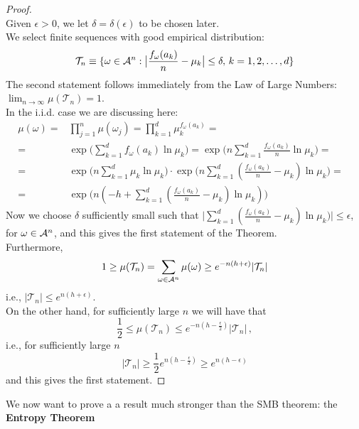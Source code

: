 \begin{proof}
    \hfill \\ 
    Given $\epsilon>0$, we let $\delta=\delta(\epsilon)$ to be chosen later.
    \\We select  finite sequences with good empirical distribution:
    \begin{equation*}
        \mathcal{T}_n \equiv \{ \omega \in \mathcal{A}^n : \big| \frac{f_\omega(a_k)}{n} - \mu_k \big| \leq \delta, \, k=1,2,\dots, d \}
    \end{equation*}
    The second statement follows immediately from the Law of Large Numbers: $\lim_{n \rightarrow \infty} \mu(\mathcal{T}_n) = 1$.
    \\In the i.i.d. case we are discussing here:
    \begin{align*}
        \mu(\omega) = & \prod_{j=1}^n \mu(\omega_j) = \prod_{k=1}^d \mu_k^{f_\omega(a_k)} =  \\
        = & \exp \big( \sum_{k=1}^d f_\omega(a_k) \ln \mu_k \big) = \exp \big( n \sum_{k=1}^d \frac{f_\omega(a_k)}{n} \ln \mu_k \big) = & \\
        = & \exp \big( n \sum_{k=1}^d \mu_k \ln \mu_k \big) \cdot \exp \big( n \sum_{k=1}^d (\frac{f_\omega(a_k)}{n} - \mu_k) \ln \mu_k \big) = & \\
        = & \exp \bigg( n (-h + \sum_{k=1}^d (\frac{f_\omega(a_k)}{n} - \mu_k) \ln \mu_k) \bigg)
    \end{align*}
    Now we choose $\delta$ sufficiently small such that $\big|  \sum_{k=1}^d (\frac{f_\omega(a_k)}{n} - \mu_k) \ln \mu_k) \big| \leq \epsilon$, for $\omega \in \mathcal{A}^n$, and this gives the first statement of the Theorem.
    \\Furthermore, 
    \begin{equation*}
        1 \geq \mu(\mathcal{T}_n) = \sum_{\omega \in \mathcal{A}^n} \mu(\omega) \geq e^{-n (h + \epsilon)} |\mathcal{T}_n|
    \end{equation*}
    i.e., $|\mathcal{T}_n| \leq e^{n(h+ \epsilon)}$.
    \\On the other hand, for sufficiently large $n$ we will have that
    \begin{equation*}
        \frac{1}{2} \leq \mu(\mathcal{T}_n) \leq e^{-n(h - \frac{\epsilon}{2})} |\mathcal{T}_n| \, ,
    \end{equation*}
    i.e., for sufficiently large $n$
    \begin{equation*}
        |\mathcal{T}_n| \geq \frac{1}{2} e^{n(h - \frac{\epsilon}{2})} \geq e^{n(h - \epsilon)} 
    \end{equation*}
    and this gives the first statement.
\end{proof}
We now want to prove a a result much stronger than the SMB theorem: the \textbf{Entropy Theorem}

